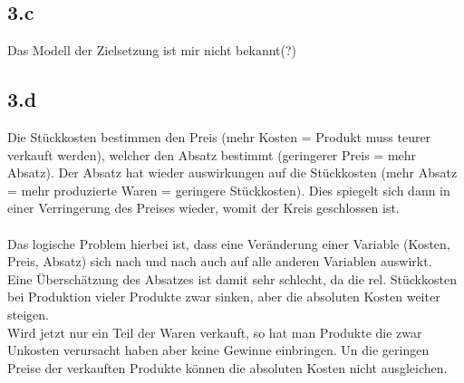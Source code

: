 \subsection{3.c}
Das Modell der Zielsetzung ist mir nicht bekannt(?) \\

\subsection{3.d}
Die Stückkosten bestimmen den Preis (mehr Kosten = Produkt muss teurer verkauft werden), welcher den Absatz bestimmt (geringerer Preis = mehr Absatz). Der Absatz hat wieder auswirkungen auf die Stückkosten (mehr Absatz = mehr produzierte Waren = geringere Stückkosten). Dies spiegelt sich dann in einer Verringerung des Preises wieder, womit der Kreis geschlossen ist. \\
\ \\
Das logische Problem hierbei ist, dass eine Veränderung einer Variable (Kosten, Preis, Absatz) sich nach und nach auch auf alle anderen Variablen auswirkt. \\
Eine Überschätzung des Absatzes ist damit sehr schlecht, da die rel. Stückkosten bei Produktion vieler Produkte zwar sinken, aber die absoluten Kosten weiter steigen. \\
Wird jetzt nur ein Teil der Waren verkauft, so hat man Produkte die zwar Unkosten verursacht haben aber keine Gewinne einbringen. Un die geringen Preise der verkauften Produkte können die absoluten Kosten nicht ausgleichen.